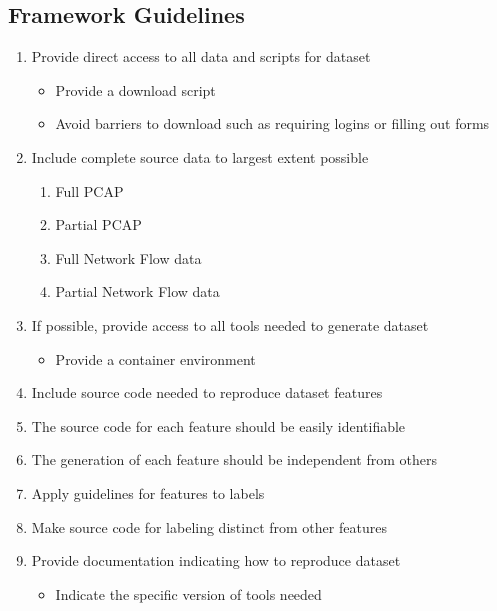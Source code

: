 \documentclass[conference]{IEEEtran}
\begin{document}
\subsection{Framework Guidelines}\label{subsec:framework_guidelines}
\begin{enumerate}
    \item Provide direct access to all data and scripts for dataset
        \begin{itemize}
            \item Provide a download script
            \item Avoid barriers to download such as requiring logins or filling out forms
        \end{itemize}

    \item Include complete source data to largest extent possible
        \begin{enumerate}
            \item Full PCAP
            \item Partial PCAP
            \item Full Network Flow data
            \item Partial Network Flow data
        \end{enumerate}

    \item If possible, provide access to all tools needed to generate dataset
        \begin{itemize}
            \item Provide a container environment
        \end{itemize}

    \item Include source code needed to reproduce dataset features

    \item The source code for each feature should be easily identifiable

    \item The generation of each feature should be independent from others

    \item Apply guidelines for features to labels

    \item Make source code for labeling distinct from other features

    \item Provide documentation indicating how to reproduce dataset
        \begin{itemize}
            \item Indicate the specific version of tools needed
        \end{itemize}

\end{enumerate}
\end{document}
